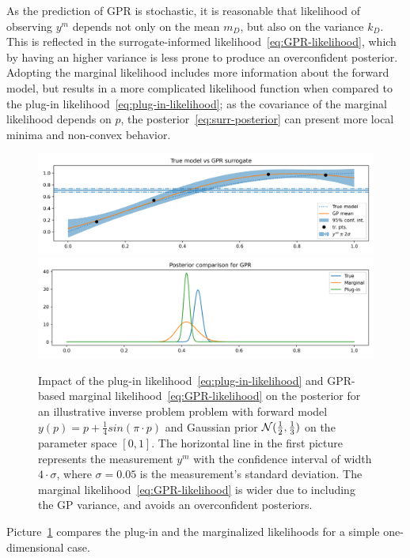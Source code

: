 As the prediction of GPR is stochastic, it is reasonable that likelihood of observing $y^m$ depends not only on the mean $m_D$, but also on the variance $k_D$. 
This is reflected in the surrogate-informed likelihood~\eqref{eq:GPR-likelihood}, which by having an higher variance is less prone to produce an overconfident posterior.
Adopting the marginal likelihood includes more information about the forward model, but results in a more complicated likelihood function when compared to the plug-in likelihood~\eqref{eq:plug-in-likelihood}; as the covariance of the marginal likelihood depends on $p$, the posterior~\ref{eq:surr-posterior} can present more local minima and non-convex behavior.
\begin{figure}[H] 

    \begin{center}
    \includegraphics[width = 360pt]{results/pictures/d1/GP_model_comparison.png}
    \includegraphics[width = 360pt]{results/pictures/d1/GP_posterior_comparison.png}
    \end{center}
    
    \caption{Impact of the plug-in likelihood~\eqref{eq:plug-in-likelihood} and GPR-based marginal likelihood~\eqref{eq:GPR-likelihood} on the posterior for an illustrative inverse problem problem with forward model $y(p) = p +\frac{1}{4} sin(\pi \cdot p)$ and Gaussian prior $\mathcal N(\frac{1}{2}, \frac{1}{3})$ on the parameter space $[0,1]$. The horizontal line in the first picture represents the measurement $y^m$ with the confidence interval of width $4 \cdot \sigma$, where $\sigma = 0.05$ is the measurement's standard deviation. The marginal likelihood~\eqref{eq:GPR-likelihood} is wider due to including the GP variance, and avoids an overconfident posteriors.} 
    \label{fig:GP-likelihoods}
\end{figure}  
Picture~\ref{fig:GP-likelihoods} compares the plug-in and the marginalized likelihoods for a simple one-dimensional case.


